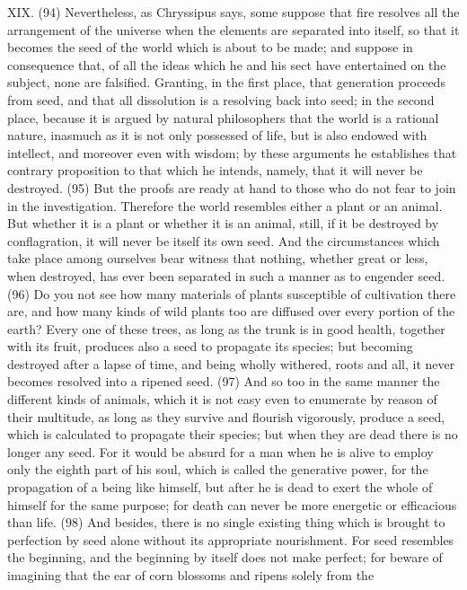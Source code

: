XIX. (94) Nevertheless, as Chryssipus says, some suppose that fire resolves all the arrangement
of the universe when the elements are separated into itself, so that it becomes the seed of the
world which is about to be made; and suppose in consequence that, of all the ideas which he and
his sect have entertained on the subject, none are falsified. Granting, in the first place, that
generation proceeds from seed, and that all dissolution is a resolving back into seed; in the second
place, because it is argued by natural philosophers that the world is a rational nature, inasmuch as
it is not only possessed of life, but is also endowed with intellect, and moreover even with wisdom;
by these arguments he establishes that contrary proposition to that which he intends, namely, that
it will never be destroyed. (95) But the proofs are ready at hand to those who do not fear to join in
the investigation. Therefore the world resembles either a plant or an animal. But whether it is a
plant or whether it is an animal, still, if it be destroyed by conflagration, it will never be itself its own
seed. And the circumstances which take place among ourselves bear witness that nothing,
whether great or less, when destroyed, has ever been separated in such a manner as to engender
seed. (96) Do you not see how many materials of plants susceptible of cultivation there are, and
how many kinds of wild plants too are diffused over every portion of the earth? Every one of these
trees, as long as the trunk is in good health, together with its fruit, produces also a seed to
propagate its species; but becoming destroyed after a lapse of time, and being wholly withered,
roots and all, it never becomes resolved into a ripened seed. (97) And so too in the same manner
the different kinds of animals, which it is not easy even to enumerate by reason of their multitude,
as long as they survive and flourish vigorously, produce a seed, which is calculated to propagate
their species; but when they are dead there is no longer any seed. For it would be absurd for a
man when he is alive to employ only the eighth part of his soul, which is called the generative
power, for the propagation of a being like himself, but after he is dead to exert the whole of himself
for the same purpose; for death can never be more energetic or efficacious than life. (98) And
besides, there is no single existing thing which is brought to perfection by seed alone without its
appropriate nourishment. For seed resembles the beginning, and the beginning by itself does not
make perfect; for beware of imagining that the ear of corn blossoms and ripens solely from the
